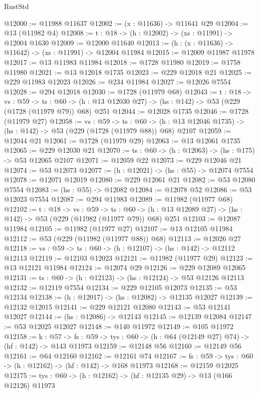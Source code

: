 \begin{lexlean}{RustStd}
\begin{coremodule}
@12000 := @11988 @11637
@12002 := (x : @11636) -> @11641 @29
@12004 := @13 (@11982 @4)
@12008 := {t : @18} -> (h : @12002) -> (xs : @11991) -> @12004 @1630
@12009 := @12000 @11640
@12013 := (h : (x : @11636) -> @11642) -> (xs : @11991) -> @12004 @11984
@12015 := @12009 @11987 @11978
@12017 := @13 @11983 @11984
@12018 := @1728 @11980
@12019 := @1758 @11980
@12021 := @13 @12018 @1735
@12023 := @229 @12018 @21
@12025 := @229 @11983 @12023
@12026 := @234 @11984
@12027 := @12026 @7554
@12028 := @294 @12018
@12030 := @1728 (@11979 @68)
@12043 := {t : @18} ->
  {vs : @59} ->
  {ts : @60} -> (h : @13 @12030 @27) -> (hs : @142) -> @53 (@229 (@1728 (@11979 @79)) @68) @251
@12044 := @12028 @1735
@12046 := @1728 (@11979 @27)
@12058 := {vs : @59} ->
  {ts : @60} -> (h : @13 @12046 @1735) -> (hs : @142) -> @53 (@229 (@1728 (@11979 @88)) @68) @2107
@12059 := @12044 @21
@12061 := @1728 (@11979 @29)
@12063 := @13 @12061 @1735
@12065 := @229 @12030 @21
@12070 := {ts : @60} -> (h : @12063) -> (hs : @175) -> @53 @12065 @2107
@12071 := @12059 @22
@12073 := @229 @12046 @21
@12074 := @53 @12073
@12077 := (h : @12021) -> (hs : @55) -> @12074 @7554
@12078 := @12071 @12019
@12080 := @229 @12061 @21
@12082 := @53 @12080 @7554
@12083 := (hs : @55) -> @12082
@12084 := @12078 @52
@12086 := @53 @12023 @7554
@12087 := @294 @11983
@12089 := @11982 (@11977 @68)
@12102 := {t : @18} ->
  {vs : @59} ->
  {ts : @60} -> (h : @13 @12089 @27) -> (hs : @142) -> @53 (@229 (@11982 (@11977 @79)) @68) @251
@12103 := @12087 @11984
@12105 := @11982 (@11977 @27)
@12107 := @13 @12105 @11984
@12112 := @53 (@229 (@11982 (@11977 @88)) @68)
@12113 := @12026 @27
@12118 := {vs : @59} -> {ts : @60} -> (h : @12107) -> (hs : @142) -> @12112 @12113
@12119 := @12103 @12023
@12121 := @11982 (@11977 @29)
@12123 := @13 @12121 @11984
@12124 := @12074 @29
@12126 := @229 @12089 @12065
@12131 := {ts : @60} -> (h : @12123) -> (hs : @12124) -> @53 @12126 @12113
@12132 := @12119 @7554
@12134 := @229 @12105 @12073
@12135 := @53 @12134
@12138 := (h : @12017) -> (hs : @12082) -> @12135 @12027
@12139 := @12132 @12015
@12141 := @229 @12121 @12080
@12143 := @53 @12141 @12027
@12144 := (hs : @12086) -> @12143
@12145 := @12139 @12084
@12147 := @53 @12025 @12027
@12148 := @140 @11972
@12149 := @105 @11972
@12158 := {k : @57} ->
  {fs : @59} -> {tys : @60} -> (h : @64 (@12149 @27) @74) -> (hf : @142) -> @143 @11973
@12159 := @12148 @56
@12160 := @12149 @56
@12161 := @64 @12160
@12162 := @12161 @74
@12167 := {fs : @59} -> {tys : @60} -> (h : @12162) -> (hf : @142) -> @168 @11973
@12168 := @12159 @12025
@12175 := {tys : @60} -> (h : @12162) -> (hf : @12135 @29) -> @13 (@166 @12126) @11973

\end{coremodule}
\end{lexlean}
